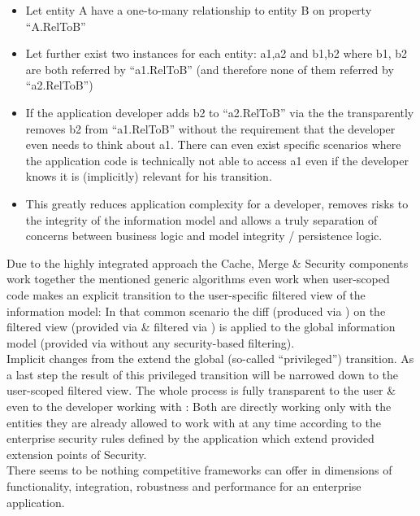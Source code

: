 \begin{enumerate}
		\begin{itemize}
			\item Let entity A have a one-to-many relationship to entity B on property ``A.RelToB''
			\item Let further exist two instances for each entity: a1,a2 and b1,b2 where b1, b2 are both referred by ``a1.RelToB'' (and therefore none of them referred by ``a2.RelToB'')
			\item If the application developer adds b2 to ``a2.RelToB'' via the \AMBETH{}  the  transparently removes b2 from ``a1.RelToB'' without the requirement that the developer even needs to think about a1. There can even exist specific scenarios where the application code is technically not able to access a1 even if the developer knows it is (implicitly) relevant for his transition.
			\item This greatly reduces application complexity for a developer, removes risks to the integrity of the information model and allows a truly separation of concerns between business logic and model integrity / persistence logic.
		\end{itemize}
\end{enumerate}
Due to the highly integrated approach the \AMBETH{} Cache, Merge \& Security components work together the mentioned generic algorithms even work when user-scoped code makes an explicit transition to the user-specific filtered view of the information model: In that common scenario the diff (produced via ) on the filtered view (provided via  \& filtered via ) is applied to the global information model (provided via  without any security-based filtering).\\

Implicit changes from the  extend the global (so-called ``privileged'') transition. As a last step the result of this privileged transition will be narrowed down to the user-scoped filtered view. The whole process is fully transparent to the user \& even to the developer working with \AMBETH{}: Both are directly working only with the entities they are already allowed to work with at any time according to the enterprise security rules defined by the application which extend provided extension points of \AMBETH{} Security.\\

There seems to be nothing competitive frameworks can offer in dimensions of functionality, integration, robustness and performance for an enterprise application.
